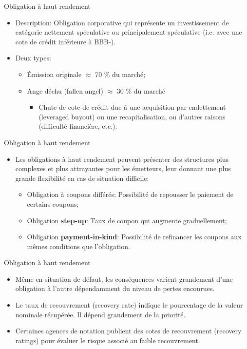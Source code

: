 \documentclass{beamer}
\begin{document}
\begin{frame}{Obligation à haut rendement}
\begin{itemize}
\item Description: Obligation corporative qui représente un investissement de catégorie nettement spéculative ou principalement spéculative (i.e. avec une cote de crédit inférieure à BBB-). 
\item Deux types: 
\begin{itemize}
\item Émission originale $\approx$ 70 \% du marché;
\item Ange déchu  (fallen angel) $\approx$ 30 \% du marché
\begin{itemize}
\item Chute de cote de crédit due à une acquisition par endettement (leveraged buyout) ou une recapitalisation, ou d’autres raisons (difficulté financière, etc.).
\end{itemize}
\end{itemize}
\end{itemize}
\end{frame}

\begin{frame}{Obligation à haut rendement}
\begin{itemize}
\item Les obligations à haut rendement peuvent présenter des structures plus complexes et plus attrayantes pour les émetteurs, leur donnant une plus grande flexibilité en cas de situation difficile: 
\begin{itemize}
\item Obligation à coupons différés: Possibilité de repousser le paiement de certains coupons;
\item Obligation \textbf{step-up}: Taux de coupon qui augmente graduellement;
\item Obligation \textbf{payment-in-kind}: Possibilité de refinancer les coupons aux mêmes conditions que l’obligation.
\end{itemize}
\end{itemize}
\end{frame}

\begin{frame}{Obligation à haut rendement}
\begin{itemize}
\item Même en situation de défaut, les conséquences varient grandement d’une obligation à l’autre dépendamment du niveau de pertes encourues. 
\item Le taux de recouvrement (recovery rate) indique le pourcentage de la valeur nominale récupérée. Il dépend grandement de la priorité.
\item Certaines agences de notation publient des cotes de recouvrement (recovery ratings) pour évaluer le risque associé au faible recouvrement.
\end{itemize}
\end{frame}
\end{document}
